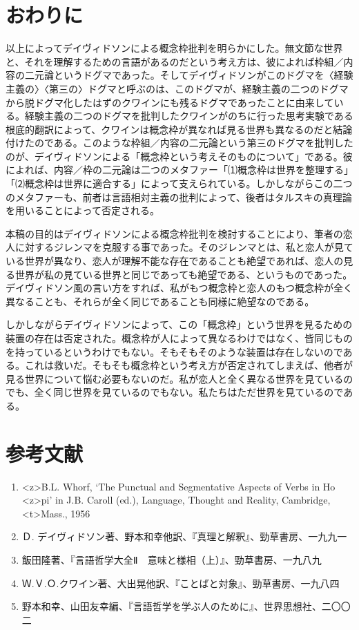 \documentclass[b5j,twoside,twocolumn]{utarticle}
\begin{document}
\section{おわりに}
以上によってデイヴィドソンによる概念枠批判を明らかにした。無文節な世界と、それを理解するための言語があるのだという考え方は、彼によれば枠組／内容の二元論というドグマであった。そしてデイヴィドソンがこのドグマを〈経験主義の〉〈第三の〉ドグマと呼ぶのは、このドグマが、経験主義の二つのドグマから脱ドグマ化したはずのクワインにも残るドグマであったことに由来している。経験主義の二つのドグマを批判したクワインがのちに行った思考実験である根底的翻訳によって、クワインは概念枠が異なれば見る世界も異なるのだと結論付けたのである。このような枠組／内容の二元論という第三のドグマを批判したのが、デイヴィドソンによる「概念枠という考えそのものについて」である。彼によれば、内容／枠の二元論は二つのメタファー「⑴概念枠は世界を整理する」「⑵概念枠は世界に適合する」によって支えられている。しかしながらこの二つのメタファーも、前者は言語相対主義の批判によって、後者はタルスキの真理論を用いることによって否定される。


本稿の目的はデイヴィドソンによる概念枠批判を検討することにより、筆者の恋人に対するジレンマを克服する事であった。そのジレンマとは、私と恋人が見ている世界が異なり、恋人が理解不能な存在であることも絶望であれば、恋人の見る世界が私の見ている世界と同じであっても絶望である、というものであった。デイヴィドソン風の言い方をすれば、私がもつ概念枠と恋人のもつ概念枠が全く異なることも、それらが全く同じであることも同様に絶望なのである。


しかしながらデイヴィドソンによって、この「概念枠」という世界を見るための装置の存在は否定された。概念枠が人によって異なるわけではなく、皆同じものを持っているというわけでもない。そもそもそのような装置は存在しないのである。これは救いだ。そもそも概念枠という考え方が否定されてしまえば、他者が見る世界について悩む必要もないのだ。私が恋人と全く異なる世界を見ているのでも、全く同じ世界を見ているのでもない。私たちはただ世界を見ているのである。

{\small
\section*{参考文献}
\renewcommand{\labelenumi}{\pbox<y>{[\arabic{enumi}]}}
\begin{enumerate}
\item \pbox<z>{B.L. Whorf, ‘The Punctual and Segmentative Aspects of Verbs in Ho} \\ \pbox<z>{pi’ in J.B. Caroll (ed.), Language, Thought and Reality, Cambridge,}\\ \pbox<t>{Mass., 1956}
\item Ｄ. デイヴィドソン著、野本和幸他訳、『真理と解釈』、勁草書房、一九九一
\item 飯田隆著、『言語哲学大全Ⅱ　意味と様相（上）』、勁草書房、一九八九
\item  Ｗ.Ｖ.Ｏ.クワイン著、大出晃他訳、『ことばと対象』、勁草書房、一九八四
\item 野本和幸、山田友幸編、『言語哲学を学ぶ人のために』、世界思想社、二〇〇二
\end{enumerate}
}
\end{document}
